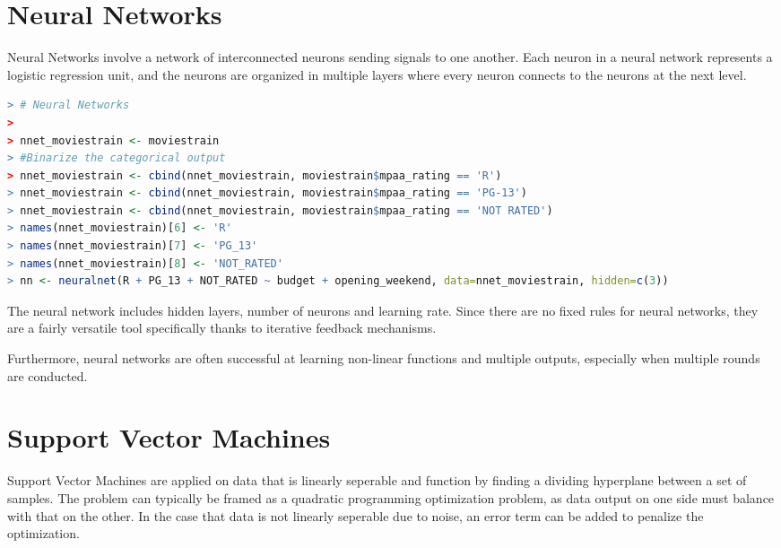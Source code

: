 \documentclass{article}
\begin{document}
\begin{spacing}{1.1}
\section{Neural Networks}

Neural Networks involve a network of interconnected neurons sending signals to one another.  Each neuron in a neural network represents a logistic regression unit, and the neurons are organized in multiple layers where every neuron connects to the neurons at the next level.  

\begin{lstlisting}[language=R]
> # Neural Networks
> 
> nnet_moviestrain <- moviestrain
> #Binarize the categorical output
> nnet_moviestrain <- cbind(nnet_moviestrain, moviestrain$mpaa_rating == 'R')
> nnet_moviestrain <- cbind(nnet_moviestrain, moviestrain$mpaa_rating == 'PG-13')
> nnet_moviestrain <- cbind(nnet_moviestrain, moviestrain$mpaa_rating == 'NOT RATED')
> names(nnet_moviestrain)[6] <- 'R'
> names(nnet_moviestrain)[7] <- 'PG_13'
> names(nnet_moviestrain)[8] <- 'NOT_RATED'
> nn <- neuralnet(R + PG_13 + NOT_RATED ~ budget + opening_weekend, data=nnet_moviestrain, hidden=c(3))
\end{lstlisting}

\vspace{3mm}

The neural network includes hidden layers, number of neurons and learning rate.  Since there are no fixed rules for neural networks, they are a fairly versatile tool specifically thanks to iterative feedback mechanisms.  

\vspace{3mm}

Furthermore, neural networks are often successful at learning non-linear functions and multiple outputs, especially when multiple rounds are conducted.  

\section{Support Vector Machines}

Support Vector Machines are applied on data that is linearly seperable and function by finding a dividing hyperplane between a set of samples.  The problem can typically be framed as a quadratic programming optimization problem, as data output on one side must balance with that on the other.  In the case that data is not linearly seperable due to noise, an error term can be added to penalize the optimization.  


\end{spacing}
\end{document}
